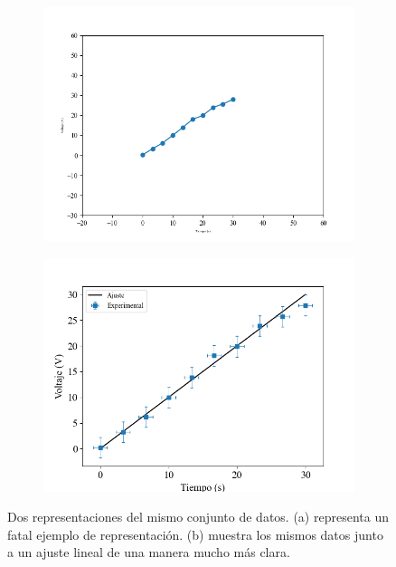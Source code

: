 \documentclass{book}
\begin{document}
\begin{figure}[h]
  
  \begin{adjustwidth}{-4.5cm}{-3cm}
  \centering
  \begin{subfigure}{0.45\pdfpagewidth}
      \centering
      \includegraphics[width=\linewidth]{assets/fig/malagrafica.png}
      \caption{}
      \label{fig:malagraf}
  \end{subfigure}
  \hfill
  \begin{subfigure}{0.45\pdfpagewidth}
      \centering
      \includegraphics[width=\linewidth]{assets/fig/buenagrafica.png}
      \caption{}
      \label{fig:buenagraf}
  \end{subfigure}
  \end{adjustwidth}
  \caption{Dos representaciones del mismo conjunto de datos. (a) representa un fatal
  ejemplo de representación. (b) muestra los mismos datos junto a un ajuste lineal
  de una manera mucho más clara.}
  \label{fig:dosgrafs}
  
\end{figure}
\end{document}

